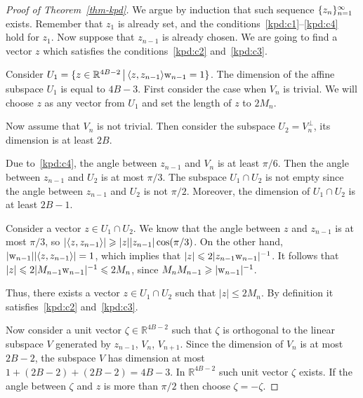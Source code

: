 \documentclass[12pt,oneside,a4paper]{amsart}
\begin{document}
\begin{proof}[Proof of Theorem~\ref{thm-kpd}]
        We argue by induction that such sequence $\{{z}_n\}_{n=1}^\infty$ exists.
        Remember that $z_1$ is already set, and the conditions~\ref{kpd:c1}--\ref{kpd:c4} hold for $z_1$.
        Now suppose that $z_{n - 1}$ is already chosen.
        We are going to find a vector $z$ which satisfies the conditions~\ref{kpd:c2} and~\ref{kpd:c3}.

        Consider $U_1 = \{z \in \mathbb{R}^{4B-2}\, \big| \, \langle z, z_{n-1} \rangle\mathrm{w}_{n-1} = 1\}$.
        The dimension of the affine subspace $U_1$ is equal to $4B - 3$.
        First consider the case when $V_n$ is trivial. We will choose $z$ as any vector from $U_1$
          and set the length of $z$ to $2 M_n$.

        Now assume that $V_n$ is not trivial.
        Then consider the subspace $U_2 = V_n^\bot$, its dimension is at least $2B$.

        Due to~\ref{kpd:c4}, the angle between $z_{n - 1}$ and $V_n$ is at least $\pi / 6$.
        Then the angle between $z_{n - 1}$ and $U_2$ is at most $\pi / 3$.
        The subspace $U_1 \cap U_2$ is not empty since the angle between $z_{n-1}$ and $U_2$ is not $\pi / 2$.
        Moreover, the dimension of $U_1 \cap U_2$ is at least $2B - 1$.

        Consider a vector $z \in U_1 \cap U_2$.
        We know that the angle between $z$ and $z_{n-1}$ is at most $\pi / 3$,
          so $\lvert \langle z, z_{n-1} \rangle \rvert \geqslant \lvert z \rvert \lvert z_{n-1}\rvert  \cos(\pi / 3)$.
        On the other hand, $\lvert\mathrm{w}_{n-1}\rvert \lvert \langle z, z_{n-1} \rangle \rvert = 1$, which implies
          that $\lvert z\rvert \leqslant 2 \lvert z_{n-1} \mathrm{w}_{n-1}\rvert^{-1}$.
        It follows that $\lvert z\rvert \leqslant 2 \lvert  M_{n-1} \mathrm{w}_{n-1}\rvert^{-1}
          \leqslant 2 M_n$, since $M_n M_{n-1} \geqslant \lvert \mathrm{w}_{n-1} \rvert^{-1}$.

        Thus, there exists a vector $z \in U_1 \cap U_2$ such that $\lvert z\rvert \leq 2 M_n$.
        By definition it satisfies~\ref{kpd:c2} and~\ref{kpd:c3}.

        Now consider a unit vector $\zeta \in \mathbb{R}^{4B - 2}$
          such that $\zeta$ is orthogonal to the linear subspace $V$ generated by
          $z_{n-1}$, $V_{n}$, $V_{n + 1}$.
        Since the dimension of $V_n$ is at most $2B - 2$,
          the subspace $V$ has dimension at most $1 + (2B - 2) + (2B - 2) = 4B - 3$.
        In $\mathbb{R}^{4B - 2}$ such unit vector $\zeta$ exists.
        If the angle between $\zeta$ and $z$ is more than $\pi/2$ then choose $\zeta = -\zeta$.


\end{proof}
\end{document}
